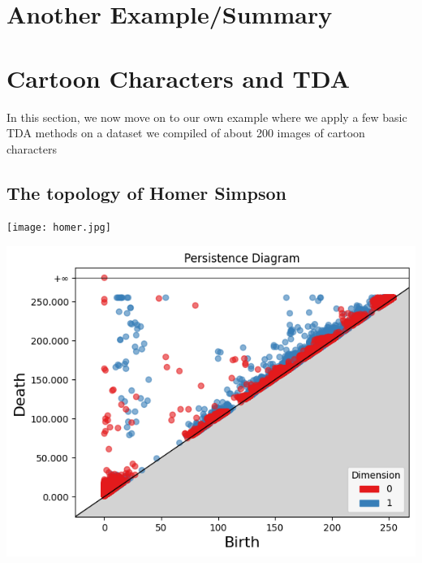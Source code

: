 \documentclass[12pt]{exam}
\begin{document}
\section{Another Example/Summary}
\newpage


\section{Cartoon Characters and TDA}

In this section, we now move on to our own example where we apply a few basic TDA methods on a dataset we compiled of about 200 images of cartoon characters


\subsection{The topology of Homer Simpson}

\begin{mdframed}
\centering
\begin{minipage}{0.18\linewidth}
    \centering
    \texttt{[image: homer.jpg]}
\end{minipage}
\hfill
\begin{minipage}{0.6\linewidth}
    \centering
    \includegraphics[width=\linewidth]{homer_pd.png}
\end{minipage}
\end{mdframed}
\end{document}
